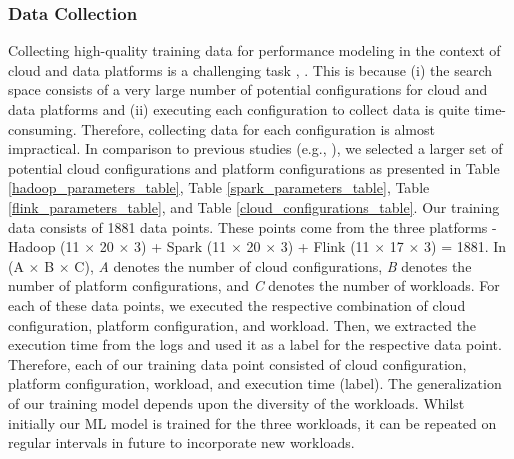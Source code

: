 \documentclass[3p]{elsarticle}
\begin{document}
\subsubsection{Data Collection} Collecting high-quality training data for performance modeling in the context of cloud and data platforms is a challenging task \cite{herodotou2020survey}, \cite{costa2021survey}. This is because (i) the search space consists of a very large number of potential configurations for cloud and data platforms and (ii) executing each configuration to collect data is quite time-consuming. Therefore, collecting data for each configuration is almost impractical. In comparison to previous studies (e.g., \cite{yigitbasi2013towards, wang2016novel, wang2012predator, herodotou2011starfish, wang2012predator, herodotou2011no, chen2013cresp, fu2015drs}), we selected a larger set of potential cloud configurations and platform configurations as presented in Table \ref{hadoop_parameters_table}, Table \ref{spark_parameters_table}, Table \ref{flink_parameters_table}, and Table \ref{cloud_configurations_table}. Our training data consists of 1881 data points. These points come from the three platforms - Hadoop (11 $\times$ 20 $\times$ 3) + Spark (11 $\times$ 20 $\times$ 3) + Flink (11 $\times$ 17 $\times$ 3) = 1881. In (A $\times$ B $\times$ C),  \textit{A} denotes the number of cloud configurations, \textit{B} denotes the number of platform configurations, and \textit{C} denotes the number of workloads. For each of these data points, we executed the respective combination of cloud configuration, platform configuration, and workload. Then, we extracted the execution time from the logs and used it as a label for the respective data point. Therefore, each of our training data point consisted of cloud configuration, platform configuration, workload, and execution time (label). The generalization of our training model depends upon the diversity of the workloads. Whilst initially our ML model is trained for the three workloads, it can be repeated on regular intervals in future to incorporate new workloads. 
\end{document}
